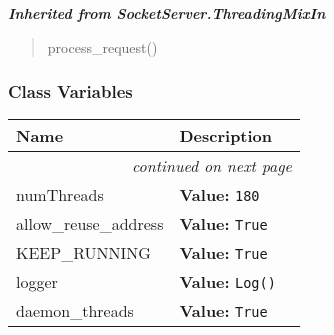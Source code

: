 \large{\textbf{\textit{Inherited from SocketServer.ThreadingMixIn}}}

\begin{quote}
process\_request()
\end{quote}


  \subsubsection{Class Variables}

    \vspace{-1cm}
\hspace{\varindent}\begin{longtable}{|p{\varnamewidth}|p{\vardescrwidth}|l}
\cline{1-2}
\cline{1-2} \centering \textbf{Name} & \centering \textbf{Description}& \\
\cline{1-2}
\endhead\cline{1-2}\multicolumn{3}{r}{\small\textit{continued on next page}}\\\endfoot\cline{1-2}
\endlastfoot\raggedright n\-u\-m\-T\-h\-r\-e\-a\-d\-s\- & \raggedright \textbf{Value:} 
{\tt 180}&\\
\cline{1-2}
\raggedright a\-l\-l\-o\-w\-\_\-r\-e\-u\-s\-e\-\_\-a\-d\-d\-r\-e\-s\-s\- & \raggedright \textbf{Value:} 
{\tt True}&\\
\cline{1-2}
\raggedright K\-E\-E\-P\-\_\-R\-U\-N\-N\-I\-N\-G\- & \raggedright \textbf{Value:} 
{\tt True}&\\
\cline{1-2}
\raggedright l\-o\-g\-g\-e\-r\- & \raggedright \textbf{Value:} 
{\tt Log()}&\\
\cline{1-2}
\raggedright d\-a\-e\-m\-o\-n\-\_\-t\-h\-r\-e\-a\-d\-s\- & \raggedright \textbf{Value:} 
{\tt True}&\\
\cline{1-2}
\end{longtable}

